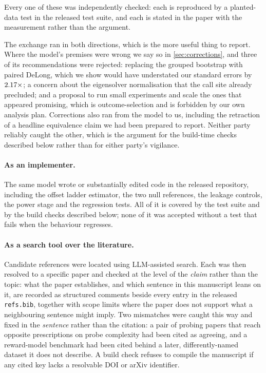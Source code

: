 Every one of these was independently checked: each is reproduced by a planted-data test in the
released test suite, and each is stated in the paper with the measurement rather than the argument.

The exchange ran in both directions, which is the more useful thing to report. Where the model's
premises were wrong we say so in \cref{sec:corrections}, and three of its recommendations were
rejected: replacing the grouped bootstrap with paired DeLong, which we show would have understated
our standard errors by $2.17{}\times$; a concern about the eigensolver
normalisation that the call site already precluded; and a proposal to run small experiments and
scale the ones that appeared promising, which is outcome-selection and is forbidden by our own
analysis plan. Corrections also ran from the model to us, including the retraction of a headline
equivalence claim we had been prepared to report. Neither party reliably caught the other, which is
the argument for the build-time checks described below rather than for either party's vigilance.

\paragraph{As an implementer.} The same model wrote or substantially edited code in the released
repository, including the offset ladder estimator, the two null references, the leakage controls,
the power stage and the regression tests. All of it is covered by the test suite and by the build
checks described below; none of it was accepted without a test that fails when the behaviour
regresses.

\paragraph{As a search tool over the literature.} Candidate references were located using
LLM-assisted search. Each was then resolved to a specific paper and checked at the level of the
\emph{claim} rather than the topic: what the paper establishes, and which sentence in this
manuscript leans on it, are recorded as structured comments beside every entry in the released
\texttt{refs.bib}, together with scope limits where the paper does not support what a neighbouring
sentence might imply. Two mismatches were caught this way and fixed in the \emph{sentence} rather
than the citation: a pair of probing papers that reach opposite prescriptions on probe complexity
had been cited as agreeing, and a reward-model benchmark had been cited behind a later,
differently-named dataset it does not describe. A build check refuses to compile the manuscript if
any cited key lacks a resolvable DOI or arXiv identifier.

